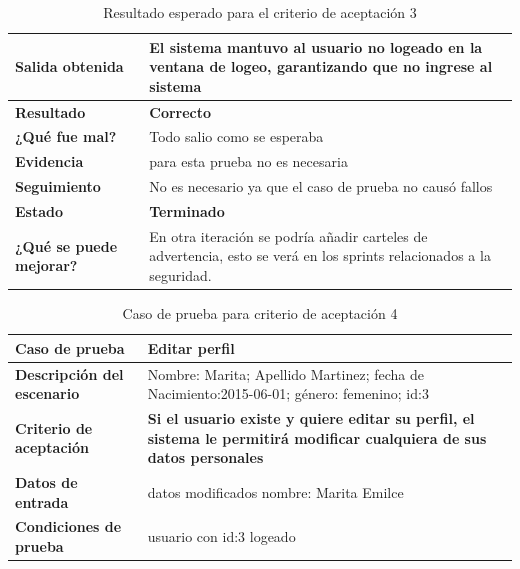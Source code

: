     {\scriptsize
	\begin{table}[h]
	\centering
	\begin{longtable}{|l|p{10cm}|}
	    \hline 
	    \textbf{Salida obtenida}&El sistema mantuvo al usuario no logeado en la ventana de logeo, garantizando que no ingrese al sistema\\ \hline
	    \textbf{Resultado}& \textbf{Correcto}\\ \hline
        \textbf{¿Qué fue mal?}& Todo salio como se esperaba\\ \hline      
        \textbf{Evidencia}& para esta prueba no es necesaria \\ \hline
        \textbf{Seguimiento}& No es necesario ya que el caso de prueba no causó
fallos \\ \hline
        \textbf{Estado}& \textbf{Terminado}\\ \hline        
        \textbf{¿Qué se puede mejorar?}& En otra iteración se podría añadir carteles de advertencia, esto se verá en los sprints relacionados a la seguridad.\\ \hline              
	    \end{longtable}
        \caption{Resultado esperado para el criterio de aceptación 3}
    	\end{table}
	}
    

\clearpage

    {\scriptsize
	\begin{table}[h]
	\centering
	\begin{tabular}{||l|p{10cm}||}
    	\rowcolor[gray]{0.9}
	    \hline 
        \hline 
	    \textbf{Caso de prueba} & \textbf{Editar perfil} \\  \hline
	    \textbf{Descripción del escenario}&Nombre: Marita; Apellido Martinez; fecha de Nacimiento:2015-06-01; género: femenino; id:3\\ \hline
	    \textbf{Criterio de aceptación}& \textbf{Si el usuario existe y quiere editar su perfil, el sistema le permitirá modificar cualquiera de sus datos personales}\\ \hline
        \textbf{Datos de entrada }& datos modificados nombre: Marita Emilce\\ \hline
        \textbf{Condiciones de  prueba}&  usuario con id:3 logeado \\ \hline \hline
	    \end{tabular}
        \caption{Caso de prueba para criterio de aceptación 4}
    	\end{table}
	}
    

